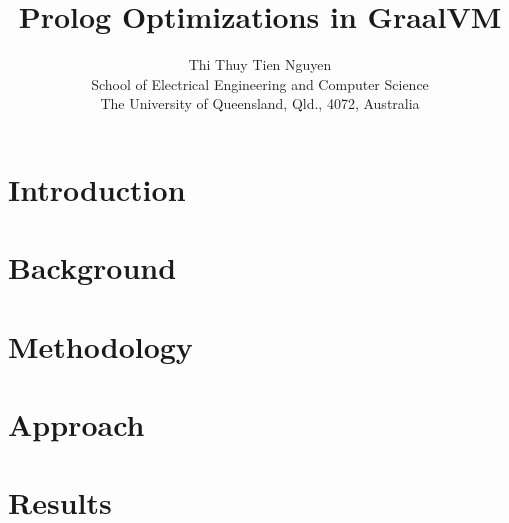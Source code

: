 \documentclass[conference]{IEEEtran}
\title{\textbf{\fontsize{14pt}{14pt}\selectfont Prolog Optimizations in GraalVM}}
\author{
    {\fontsize{12pt}{12pt}\selectfont Thi Thuy Tien Nguyen}\\
    {\fontsize{12pt}{12pt}\selectfont School of Electrical Engineering and Computer Science}\\
    {\fontsize{12pt}{12pt}\selectfont The University of Queensland, Qld., 4072, Australia}\\
}
\begin{document}
\maketitle

\begin{abstract}
\end{abstract}
\bigbreak
{
    \begin{spacing}{1.2}
        \it\fontsize{11pt}{11pt}\selectfont\setlength{\parindent}{5mm}\justifying
        
    \end{spacing}
}

\smallbreak
\smallbreak
\section{Introduction}
{
    \bigbreak
    \begin{spacing}{1.1}
        \fontsize{10pt}{10pt}\selectfont\setlength{\parindent}{5mm}\justifying
        
    \end{spacing}
}

\section{Background}
{
    \bigbreak
    \begin{spacing}{1.1}
        \fontsize{10pt}{10pt}\selectfont\setlength{\parindent}{5mm}\justifying
        
    \end{spacing}
}

\section{Methodology}
{
    \bigbreak
    \begin{spacing}{1.1}
        \fontsize{10pt}{10pt}\selectfont\setlength{\parindent}{5mm}\justifying
        
    \end{spacing}
}

\section{Approach}
{
    \begin{spacing}{1.1}
        \fontsize{10pt}{10pt}\selectfont\setlength{\parindent}{5mm}\justifying
        
    \end{spacing}
}

\section{Results}
{
    \begin{spacing}{1.1}
        \fontsize{10pt}{10pt}\selectfont\setlength{\parindent}{5mm}\justifying
        
    \end{spacing}
}
\end{document}
